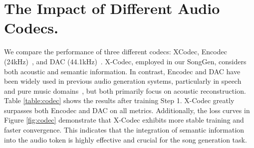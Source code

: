 

 










\section{The Impact of Different Audio Codecs.}
We compare the performance of three different codecs: XCodec, Encodec (24kHz)~\cite{defossez2022encodec}, and DAC (44.1kHz)~\cite{kumar2024DAC}. X-Codec, employed in our SongGen, considers both acoustic and semantic information. In contrast, Encodec and DAC have been widely used in previous audio generation systems, particularly in speech~\cite{lyth2024parler} and pure music domains~\cite{copet2024musicgen}, but both primarily focus on acoustic reconstruction.
Table \ref{table:codec} shows the results after training Step 1. X-Codec greatly surpasses both Encodec and DAC on all metrics. Additionally, the loss curves in Figure \ref{fig:codec} demonstrate that X-Codec exhibits more stable training and faster convergence. This indicates that the integration of semantic information into the audio token is highly effective and crucial for the song generation task.

